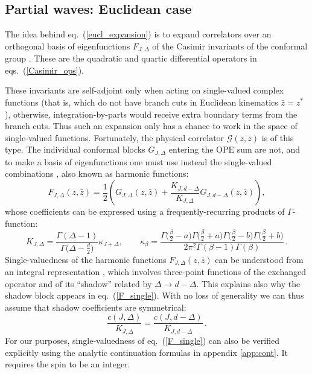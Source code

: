 \documentclass[11pt, reqno,preprint]{article}
\def\be{\begin{equation}}
\def\ee{\end{equation}}
\def\zbar{\bar{z}}
\def\j{J}
\def\c{c}
\def\GG{\mathcal{G}}
\begin{document}
\subsection{Partial waves: Euclidean case}
\label{ssec:eucl}

The idea behind eq.~(\ref{eucl_expansion}) is to expand correlators over an orthogonal basis of eigenfunctions
$F_{\j,\Delta}$ of the Casimir invariants of the conformal group \cite{Costa:2012cb}.
These are the quadratic and quartic differential operators in eqs.~(\ref{Casimir_ops}).

These invariants are self-adjoint only when acting on single-valued complex functions (that is, which do not have branch cuts in Euclidean kinematics $\zbar=z^*$), otherwise, integration-by-parts would receive extra boundary terms from the branch cuts.
Thus such an expansion only has a chance to work in the space of single-valued functions.
Fortunately, the physical correlator $\GG(z,\zbar)$ is of this type.
The individual conformal blocks $G_{\j,\Delta}$ entering the OPE sum are not, and
to make a basis of eigenfunctions one must use instead the single-valued combinations \cite{Costa:2012cb}, also known as harmonic functions:
\be
 F_{\j,\Delta}(z,\zbar) = \frac12\left(G_{\j,\Delta}(z,\zbar) + \frac{K_{\j,d-\Delta}}{K_{\j,\Delta}} G_{\j,d-\Delta}(z,\zbar)\right), \label{F_single}
\ee
whose coefficients can be expressed using a frequently-recurring products of $\Gamma$-function:
\be
K_{\j,\Delta} = \frac{\Gamma(\Delta-1)}{\Gamma\big(\Delta-\tfrac{d}{2}\big)}\kappa_{\j+\Delta},
\qquad
\kappa_\beta=\frac{\Gamma\big(\tfrac{\beta}{2}-a\big)\Gamma\big(\tfrac{\beta}{2}+a\big)\Gamma\big(\tfrac{\beta}{2}-b\big)\Gamma\big(\tfrac{\beta}{2}+b\big)}
 {2\pi^2\Gamma(\beta-1)\Gamma(\beta)}\,. \label{kappa}
\ee
Single-valuedness of the harmonic functions $F_{\j,\Delta}(z,\zbar)$ can be understood from an integral representation \cite{SimmonsDuffin:2012uy},
which involves three-point functions of the exchanged operator and of its ``shadow'' related by $\Delta\to d-\Delta$.
This explains also why the shadow block appears in eq.~(\ref{F_single}).
With no loss of generality we can thus assume that shadow coefficients are symmetrical:
\be
\frac{\c(\j,\Delta)}{K_{\j,\Delta}}= \frac{\c(\j,d-\Delta)}{K_{\j,d-\Delta}}\,. \label{shadow}
\ee
For our purposes, single-valuedness of eq.~(\ref{F_single}) can also be verified explicitly using the analytic continuation formulas in appendix \ref{app:cont}.
It requires the spin to be an integer.
\end{document}
